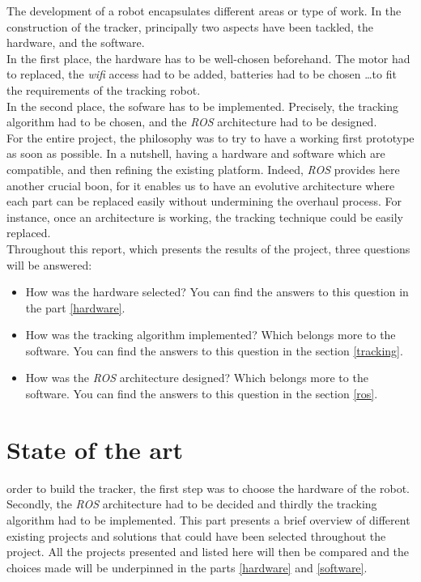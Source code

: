 		The development of a robot encapsulates different areas or type of work.
		In the construction of the tracker, principally two aspects 
		have been tackled, the hardware, and the software.
		\\\indent In the first place, the hardware has to be well-chosen beforehand.
		The motor had to replaced, the \textit{wifi} access had to be added, batteries 
		had to be chosen \dots to fit the requirements of the tracking robot.
		\\\indent In the second place, the sofware has to be implemented. Precisely, 
		the tracking algorithm had to be chosen, and the \textit{ROS} architecture had 
		to be designed.
		\\\indent For the entire project, the philosophy was to try to have 
		a working first prototype as soon as possible. In a nutshell, 
		having a hardware and software which are compatible, and then refining
		the existing platform. Indeed, \textit{ROS} provides here another
		crucial boon, for it enables us to have an evolutive architecture 
		where each part can be replaced easily without 
		undermining the overhaul process. For instance, once 
		an architecture is working, the tracking technique could
		be easily replaced.
		\\\indent Throughout this report, which presents the 
		results of the project, three questions will be answered:
		\begin{itemize}
			\item[\textbullet] How was the hardware selected?
			You can find the answers to 
			this question in the part \vref{hardware}.
			\item[\textbullet] How was the tracking algorithm implemented? Which belongs 
			more to the software. You can find the answers to 
			this question in the section \vref{tracking}.
			\item[\textbullet] How was the \textit{ROS} architecture designed? 
			Which belongs more to the software. You can find the answers to 
			this question in the section \vref{ros}.
		\end{itemize}
		
\chapter{State of the art}

		 order to build the tracker, the first step was to choose the
		hardware of the robot. Secondly, the \textit{ROS} architecture had to be decided
		and thirdly the tracking algorithm had to be implemented. This part 
		presents a brief overview of different existing projects and solutions 
		that could have been selected throughout the project. All the projects
		presented and listed here will then be compared and the choices
		made will be underpinned in the parts \vref{hardware} and \vref{software}.
		
